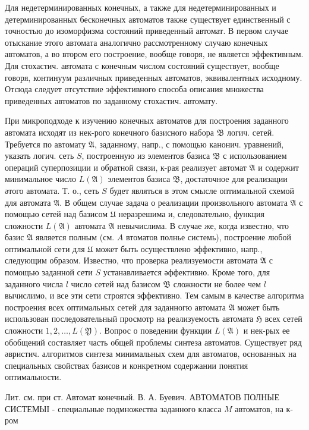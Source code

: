 \documentclass[10pt]{article}
\begin{document}
Для недетерминированных конечных, а также для недетерминированных и детерминированных бесконечных автоматов также существует единственный с точностью до изоморфизма состояний приведенный автомат. В первом случае отыскание этого автомата аналогично рассмотренному случаю конечных автоматов, а во втором его построение, вообще говоря, не является эффективным. Для стохастич. автомата с конечным числом состояний существует, вообще говоря, континуум различных приведенных автоматов, эквивалентных исходному. Отсюда следует отсутствие эффективного способа описания множества приведенных автоматов по заданному стохастич. автомату.



При микроподходе к изучению конечных автоматов для построения заданного автомата исходят из нек-рого конечного базисного набора $\mathfrak{B}$ логич. сетей. Требуется по автомату $\mathfrak{A}$, заданному, напр., с помощью канонич. уравнений, указать логич. сеть $S$, построенную из элементов базиса $\mathfrak{B}$ с использованием операций суперпозиции и обратной связи, к-рая реализует автомат $\mathfrak{A}$ и содержит минимальное число $L(\mathfrak{A})$ элементов базиса $\mathfrak{B}$, достаточное для реализации әтого автомата. Т. о., сеть $S$ будет являться в этом смысле оптимальной схемой для автомата $\mathfrak{A}$. В общем случае задача о реализации произвольного автомата $\mathfrak{A}$ с помощью сетей над базисом $\mathfrak{U}$ неразрешима и, следовательно, функция сложности $L(\mathfrak{\mathfrak { A }})$ автомата $\mathfrak{A}$ невычислима. В случае же, когда известно, что базис $\mathfrak{A}$ является полным (см. $A$ втоматов полнье системь), построение любой оптимальной сети для $\mathfrak{U}$ может быть осуществлено эффективно, напр., следующим образом. Известно, что проверка реализуемости автомата $\mathfrak{A}$ с помощью заданной сети $S$ устанавливается әффективно. Кроме того, для заданного числа $l$ число сетей над базисом $\mathfrak{B}$ сложности не более чем $l$ вычислимо, и все эти сети строятся эффективно. Тем самым в качестве алгоритма построения всех оптимальных сетей для заданногю автомата $\mathfrak{A}$ может быть использован последовательный просмотр на реализуемость автомата $\mathfrak{H}$ всех сетей сложности $1,2, \ldots, L(\mathfrak{Y})$. Вопрос о поведении функции $L(\mathfrak{A})$ и нек-рых ее обобщений составляет часть общей проблемы синтеза автоматов. Существует ряд әвристич. алгоритмов синтеза минимальных схем для автоматов, основанных на специальных свойствах базисов и конкретном содержании понятия оптимальности.



Лит. см. при ст. Автомат конечный. В. А. Буевич. АВТОМАТОВ ПОЛНЫЕ СИСТЕМЫІ - специальные подмножества заданного класса $M$ автоматов, на к-ром
\end{document}
